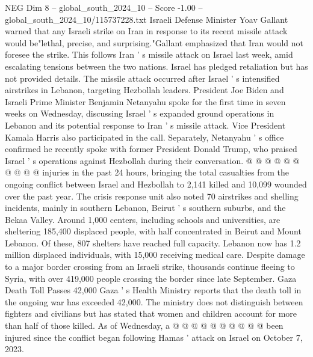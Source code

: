 \begin{textsample}{NEG Dim 8 – global\_south\_2024\_10 – Score -1.00 – global\_south\_2024\_10/115737228.txt}
Israeli Defense Minister Yoav Gallant warned that any Israeli strike on Iran in response to its recent missile attack would be"lethal, precise, and surprising."Gallant emphasized that Iran would not foresee the strike.
This follows Iran ' s missile attack on Israel last week, amid escalating tensions between the two nations.
Israel has pledged retaliation but has not provided details.
The missile attack occurred after Israel ' s intensified airstrikes in Lebanon, targeting Hezbollah leaders.
President Joe Biden and Israeli Prime Minister Benjamin Netanyahu spoke for the first time in seven weeks on Wednesday, discussing Israel ' s expanded ground operations in Lebanon and its potential response to Iran ' s missile attack.
Vice President Kamala Harris also participated in the call.
Separately, Netanyahu ' s office confirmed he recently spoke with former President Donald Trump, who praised Israel ' s operations against Hezbollah during their conversation. @ @ @ @ @ @ @ @ @ @ injuries in the past 24 hours, bringing the total casualties from the ongoing conflict between Israel and Hezbollah to 2,141 killed and 10,099 wounded over the past year.
The crisis response unit also noted 70 airstrikes and shelling incidents, mainly in southern Lebanon, Beirut ' s southern suburbs, and the Bekaa Valley.
Around 1,000 centers, including schools and universities, are sheltering 185,400 displaced people, with half concentrated in Beirut and Mount Lebanon.
Of these, 807 shelters have reached full capacity.
Lebanon now has 1.2 million displaced individuals, with 15,000 receiving medical care.
Despite damage to a major border crossing from an Israeli strike, thousands continue fleeing to Syria, with over 419,000 people crossing the border since late September.
Gaza Death Toll Passes 42,000 Gaza ' s Health Ministry reports that the death toll in the ongoing war has exceeded 42,000.
The ministry does not distinguish between fighters and civilians but has stated that women and children account for more than half of those killed.
As of Wednesday, a @ @ @ @ @ @ @ @ @ @ been injured since the conflict began following Hamas ' attack on Israel on October 7, 2023.

\end{textsample}
